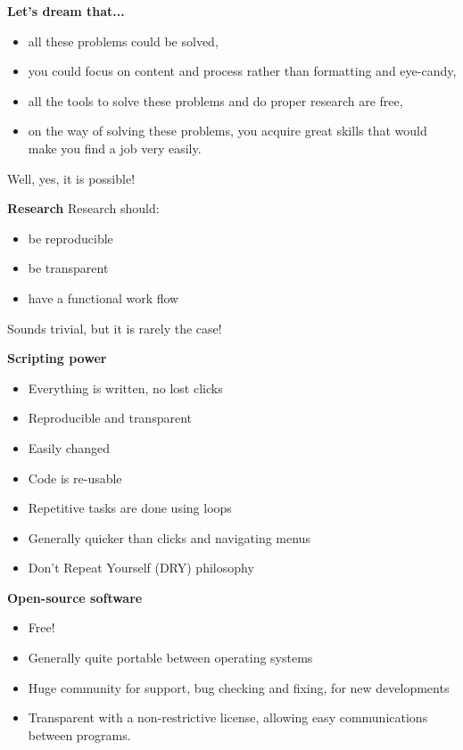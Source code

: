\documentclass[9pt,xcolor=pdftex,dvipsnames,table]{beamer}
\begin{document}
\begin{frame}{\textbf{Let's dream that...}}
\begin{itemize}
\item all these problems could be solved,
\item you could focus on content and process rather than formatting
  and eye-candy,
\item all the tools to solve these problems and do proper research are free,
\item on the way of solving these problems, you acquire great skills
  that would make you find a job very easily.
\end{itemize}
\vspace{0.6cm}
Well, yes, it is possible!
\vspace{-0.5cm}
\end{frame}


\begin{frame}{\textbf{Research}}
Research should:
\begin{itemize}
\item be reproducible
\item be transparent
\item have a functional work flow
\end{itemize}
\vspace{0.6cm}
Sounds trivial, but it is rarely the case!
\vspace{-0.5cm}
\end{frame}


\begin{frame}{\textbf{Scripting power}}
  \begin{itemize}
  \item Everything is written, no lost clicks
  \item Reproducible and transparent
  \item Easily changed
  \item Code is re-usable
  \item Repetitive tasks are done using loops
  \item Generally quicker than clicks and navigating menus
  \item Don't Repeat Yourself (DRY) philosophy
  \end{itemize}
\end{frame}


\begin{frame}{\textbf{Open-source software}}
\begin{itemize}
\item Free!
\item Generally quite portable between operating systems
\item Huge community for support, bug checking and fixing, for new developments
\item Transparent with a non-restrictive license, allowing easy
  communications between programs.
\end{itemize}
\end{frame}
\end{document}
